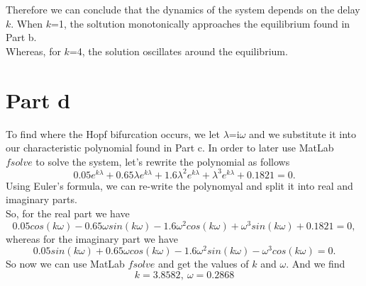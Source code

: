 Therefore we can conclude that the dynamics of the system depends on the delay $k$. When $k$=1, the soltution monotonically approaches the equilibrium found in Part b.\\
Whereas, for $k$=4, the solution oscillates around the equilibrium.
\section{Part d}
To find where the Hopf bifurcation occurs, we let $\lambda$=i$\omega$ and we substitute it into our characteristic polynomial found in Part c. In order to later use MatLab $\textit{fsolve}$ to solve the system, let's rewrite the polynomial as follows
$$
0.05e^{k\lambda} + 0.65\lambda e^{k\lambda} + 1.6\lambda^{2}e^{k\lambda} + \lambda^{3}e^{k\lambda} + 0.1821 = 0.
$$
Using Euler's formula, we can re-write the polynomyal and split it into real and imaginary parts.\\
So, for the real part we have
$$
0.05cos(k\omega) - 0.65\omega sin(k\omega) - 1.6\omega^{2}cos(k\omega) + \omega^{3}sin(k\omega) + 0.1821 = 0,
$$
whereas for the imaginary part we have
$$
0.05sin(k\omega) + 0.65\omega cos(k\omega) - 1.6\omega^{2}sin(k\omega) - \omega^{3}cos(k\omega) = 0.
$$
So now we can use MatLab $fsolve$ and get the values of $k$ and $\omega$.
And we find
$$
k = 3.8582, \ \omega=0.2868
$$